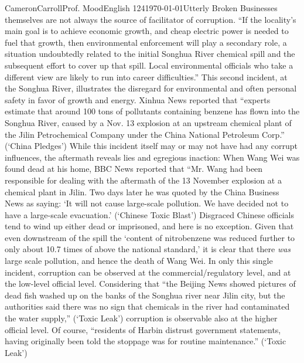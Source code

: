 \begin{mla}{Cameron}{Carroll}{Prof. Mood}{English 124}{\today}{Utterly Broken}
Businesses themselves are not always the source of facilitator of corruption. ``If the locality's main goal is to achieve economic growth, and cheap electric power is needed to fuel that growth, then environmental enforcement will play a secondary role, a situation undoubtedly related to the initial Songhua River chemical spill and the subsequent effort to cover up that spill. Local environmental officials who take a different view are likely to run into career difficulties.'' This second incident, at the Songhua River, illustrates the disregard for environmental and often personal safety in favor of growth and energy. Xinhua News reported that  ``experts estimate that around 100 tons of pollutants containing benzene has flown into the Songhua River, caused by a Nov. 13 explosion at an upstream chemical plant of the Jilin Petrochemical Company under the China National Petroleum Corp.'' (`China Pledges') While this incident itself may or may not have had any corrupt influences, the aftermath reveals lies and egregious inaction: When Wang Wei was found dead at his home, BBC News reported that ``Mr. Wang had been responsible for dealing with the aftermath of the 13 November explosion at a chemical plant in Jilin. Two days later he was quoted by the China Business News as saying: `It will not cause large-scale pollution. We have decided not to have a large-scale evacuation.' (`Chinese Toxic Blast') Disgraced Chinese officials tend to wind up either dead or imprisoned, and here is no exception. Given that even downstream of the spill the `content of nitrobenzene was reduced further to only about 10.7 times of above the national standard,' it is clear that there \emph{was} large scale pollution, and hence the death of Wang Wei. In only this single incident, corruption can be observed at the commercial/regulatory level, and at the low-level official level. Considering that ``the Beijing News showed pictures of dead fish washed up on the banks of the Songhua river near Jilin city, but the authorities said there was no sign that chemicals in the river had contaminated the water supply,'' (`Toxic Leak') corruption is observable also at the higher official level. Of course, ``residents of Harbin distrust government statements, having originally been told the stoppage was for routine maintenance.'' (`Toxic Leak')


\end{mla}
